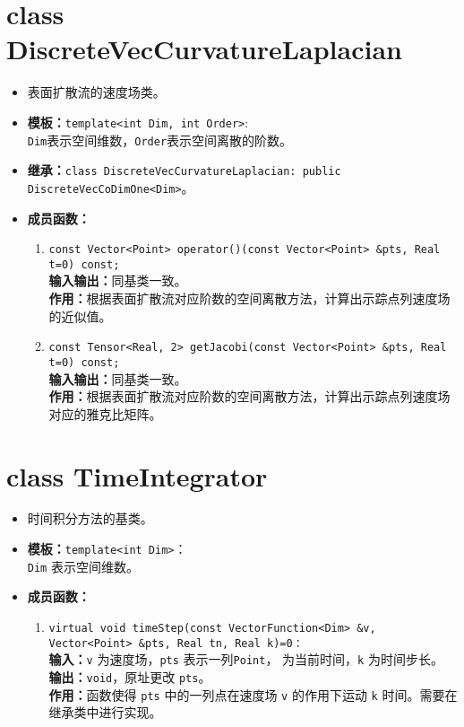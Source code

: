 \documentclass[a4paper,twoside]{ctexart}
\begin{document}
\section{class DiscreteVecCurvatureLaplacian}
\begin{itemize}
    \item 表面扩散流的速度场类。
    \item \textbf{模板：}\texttt{template<int Dim, int Order>}:\\
    \texttt{Dim}表示空间维数，\texttt{Order}表示空间离散的阶数。
    \item \textbf{继承：}\texttt{class DiscreteVecCurvatureLaplacian: public DiscreteVecCoDimOne<Dim>}。
    \item \textbf{成员函数：}
        \begin{enumerate}[(1)]
            \item \texttt{const Vector<Point> operator()(const Vector<Point> \&pts, Real t=0) const;}\\
            \textbf{输入输出：}同基类一致。\\
            \textbf{作用：}根据表面扩散流对应阶数的空间离散方法，计算出示踪点列速度场的近似值。
            \item \texttt{const Tensor<Real, 2> getJacobi(const Vector<Point> \&pts, Real t=0) const;}\\
            \textbf{输入输出：}同基类一致。\\
            \textbf{作用：}根据表面扩散流对应阶数的空间离散方法，计算出示踪点列速度场对应的雅克比矩阵。
        \end{enumerate}
\end{itemize}


\section{class TimeIntegrator}
\begin{itemize}
    \item 时间积分方法的基类。
    \item \textbf{模板：}\texttt{template<int Dim>}：\\\texttt{Dim} 表示空间维数。
    \item \textbf{成员函数：}
            \begin{enumerate}[(1)]
                \item \texttt{virtual void timeStep(const VectorFunction<Dim> \&v, Vector<Point> \&pts, Real tn, Real k)=0：}\\
                \textbf{输入：}\texttt{v} 为速度场，\texttt{pts} 表示一列\texttt{Point}， 为当前时间，\texttt{k} 为时间步长。\\
                \textbf{输出：}\texttt{void}，原址更改 \texttt{pts}。\\
                \textbf{作用：}函数使得 \texttt{pts} 中的一列点在速度场 \texttt{v} 的作用下运动 \texttt{k} 时间。需要在继承类中进行实现。
            \end{enumerate}
\end{itemize}
\end{document}
